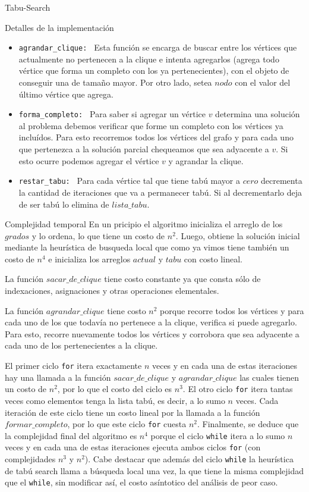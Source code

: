 \begin{section}{Tabu-Search}
\begin{subsection}{Detalles de la implementación}
\begin{itemize}
			\item \texttt{agrandar\_clique: } Esta función se encarga de buscar entre los vértices que actualmente no pertenecen a la clique e intenta agregarlos (agrega todo vértice que forma un completo con los ya pertenecientes), con el objeto de conseguir una de tamaño mayor. Por otro lado, setea $nodo$ con el valor del último vértice que agrega.
		
			\item \texttt{forma\_completo: } Para saber si agregar un vértice $v$ determina una solución al problema debemos verificar que forme un completo con los vértices ya incluídos. Para esto recorremos todos los vértices del grafo y para cada uno que pertenezca a la solución parcial chequeamos que sea adyacente a $v$. Si esto ocurre podemos agregar el vértice $v$ y agrandar la clique.

			\item \texttt{restar\_tabu: } Para cada vértice tal que tiene tabú mayor a $cero$ decrementa la cantidad de iteraciones que va a permanecer tabú. Si al decrementarlo deja de ser tabú lo elimina de $lista\_tabu$.
		\end{itemize}

	\end{subsection}
	\begin{subsection}{Complejidad temporal}
			En un pricipio el algoritmo inicializa el arreglo de los $grados$ y lo ordena, lo que tiene un costo de $n^2$. Luego, obtiene la solución inicial mediante la heurística de busqueda local que como ya vimos tiene también un costo de $n^4$ e inicializa los arreglos $actual$ y $tabu$ con costo lineal.

			La función $sacar\_de\_clique$ tiene costo constante ya que consta sólo de indexaciones, asignaciones y otras operaciones elementales.

			La función $agrandar\_clique$ tiene costo $n^2$ porque recorre todos los vértices y para cada uno de los que todavía no pertenece a la clique, verifica si puede agregarlo. Para esto, recorre nuevamente todos los vértices y corrobora que sea adyacente a cada uno de los pertenecientes a la clique.

			 El primer ciclo \texttt{for} itera exactamente $n$ veces y en cada una de estas iteraciones hay una llamada a la función $sacar\_de\_clique$ y $agrandar\_clique$ las cuales tienen un costo de $n^2$, por lo que el costo del ciclo es $n^3$. El otro ciclo \texttt{for} itera tantas veces como elementos tenga la lista tabú, es decir, a lo sumo $n$ veces. Cada iteración de este ciclo tiene un costo lineal por la llamada a la función $formar\_completo$, por lo que este ciclo \texttt{for} cuesta $n^2$.
			 Finalmente, se deduce que la complejidad final del algoritmo es $n^4$ porque el ciclo \texttt{while} itera a lo sumo $n$ veces y en cada una de estas iteraciones ejecuta ambos ciclos \texttt{for} (con complejidades $n^3$ y $n^2$). Cabe destacar que además del ciclo \texttt{while} la heurística de tabú search llama a búsqueda local una vez, la que tiene la misma complejidad que el \texttt{while}, sin modificar así, el costo asíntotico del análisis de peor caso.


\end{subsection}
\end{section}

